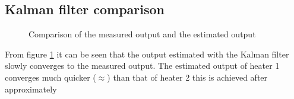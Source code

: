 \subsection{Kalman filter comparison}
\begin{figure}
    \centering
    
    \caption{Comparison of the measured output and the estimated output}
    \label{fig:comp_Kalman}
\end{figure}
From figure \ref{fig:comp_Kalman} it can be seen that the output estimated with the Kalman filter slowly converges to the measured output. The estimated output of heater 1 converges much quicker ($\approx $) than that of heater 2 this is achieved after approximately
